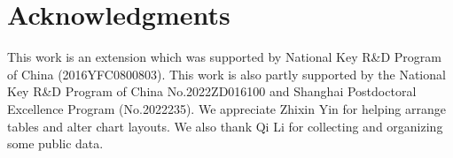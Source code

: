 \section*{Acknowledgments}
This work is an extension which was supported by National Key R\&D Program of China (2016YFC0800803).  This work is also partly
supported by the National Key R\&D Program of China
No.2022ZD016100 and Shanghai Postdoctoral Excellence
Program (No.2022235). We appreciate Zhixin Yin for helping arrange tables and alter chart layouts. We also thank Qi Li for collecting and organizing some public data.

\clearpage

